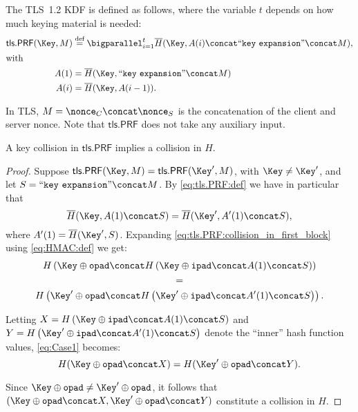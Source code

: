 The TLS~1.2 KDF is defined as follows,
where the variable $t$ depends on how much keying material is needed:
\begin{align}
	\mathsf{tls.PRF}(\Key, M) &\overset{\text{def}}{=} \bigparallel_{i=1}^t \HMAC(\Key, A(i) \concat ``\mathtt{key\ expansion}" \concat M)\label{eq:tls.PRF:def}, \\
	 \intertext{with}
	 A(1) &= \HMAC(\Key, ``\mathtt{key\ expansion}" \concat M) \label{eq:A(1):def} \nonumber \\
	 A(i) &= \HMAC(\Key, A(i-1)).	\nonumber
\end{align}

In TLS,
$M = \nonce_{C} \concat \nonce_{S}$ is the concatenation of the client and server nonce.
Note that $\mathsf{tls.PRF}$ does not take any auxiliary input. 

\begin{theorem}\label{thm:tls.PRF:collision_resistance}
A key collision in $\mathsf{tls.PRF}$  implies a collision in $H$.
\end{theorem}
\begin{proof}

Suppose $\mathsf{tls.PRF}(\Key, M) = \mathsf{tls.PRF}(\Key', M)$, with $\Key \neq \Key'$,
and let $S = ``\mathtt{key\ expansion}" \concat M$.
By \eqref{eq:tls.PRF:def} we have in particular that 
\begin{equation}\label{eq:tls.PRF:collision_in_first_block}
	\HMAC(\Key, A(1) \concat S) = \HMAC(\Key', A'(1) \concat S),
\end{equation}
where $A'(1) = \HMAC(\Key',S)$.
Expanding \eqref{eq:tls.PRF:collision_in_first_block} using \eqref{eq:HMAC:def} we get: 
\begin{equation}
	\begin{gathered}\label{eq:Case1}
		H \left(\Key \oplus \padO \concat H \left(\Key \oplus \padI \concat A(1) \concat S \right) \right) \\
		= \\
		H \left(\Key' \oplus \padO \concat H \left(\Key' \oplus \padI \concat A'(1) \concat S \right) \right) .
	\end{gathered}
\end{equation}

Letting $X = H \left(\Key \oplus \padI \concat A(1) \concat S \right)$ and $Y = H \left(\Key' \oplus \padI \concat A'(1) \concat S \right)$ denote the ``inner'' hash function values,
\eqref{eq:Case1} becomes:
\begin{equation}\label{eq:}
	H (\Key \oplus \padO \concat X )
	=
	H (\Key' \oplus \padO \concat Y )  .
\end{equation}

Since $\Key \oplus \padO  \neq \Key' \oplus \padO$,
it follows that  $(\Key \oplus \padO \concat X, \Key' \oplus \padO \concat Y)$ constitute a collision in $H$. 
\end{proof}

